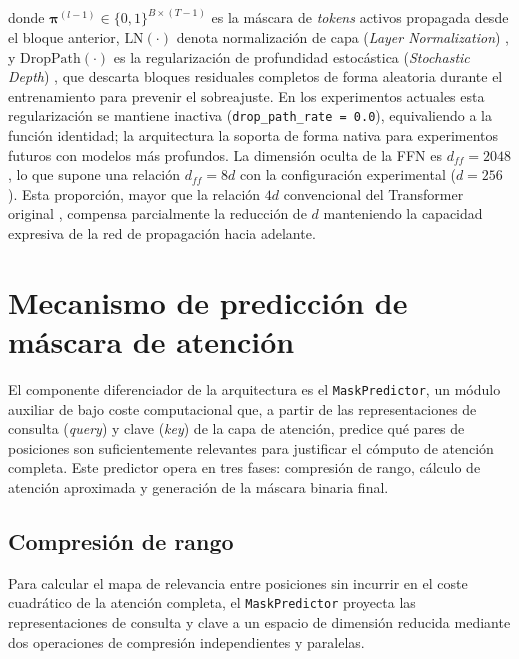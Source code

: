 donde $\boldsymbol{\pi}^{(l-1)} \in \{0,1\}^{B \times (T-1)}$ es la máscara de
\textit{tokens} activos propagada desde el bloque anterior, $\text{LN}(\cdot)$ denota
normalización de capa (\textit{Layer Normalization}) \cite{ba2016layer}, y $\text{DropPath}(\cdot)$ es la regularización de profundidad
estocástica (\textit{Stochastic Depth}) \cite{huang2016deep},
que descarta bloques residuales completos de forma aleatoria
durante el entrenamiento para prevenir el sobreajuste. En los
experimentos actuales esta regularización se mantiene inactiva
(\texttt{drop\_path\_rate = 0.0}), equivaliendo a la función
identidad; la arquitectura la soporta de forma nativa para
experimentos futuros con modelos más profundos.
La dimensión oculta de la FFN es $d_{ff} = 2048$, lo que supone
una relación $d_{ff} = 8d$ con la configuración experimental
($d = 256$). Esta proporción, mayor que la relación $4d$
convencional del Transformer original \cite{vaswani2017attention},
compensa parcialmente la reducción de $d$ manteniendo la capacidad
expresiva de la red de propagación hacia adelante.

\section{Mecanismo de predicción de máscara de atención}
\label{sec:mask_predictor}

El componente diferenciador de la arquitectura es el \texttt{MaskPredictor}, un módulo
auxiliar de bajo coste computacional que, a partir de las representaciones de consulta
(\textit{query}) y clave (\textit{key}) de la capa de atención, predice qué pares de
posiciones son suficientemente relevantes para justificar el cómputo de atención completa.
Este predictor opera en tres fases: compresión de rango, cálculo de atención aproximada
y generación de la máscara binaria final.

\subsection{Compresión de rango}
\label{subsec:compresion_rango}

Para calcular el mapa de relevancia entre posiciones sin incurrir en el coste cuadrático
de la atención completa, el \texttt{MaskPredictor} proyecta las representaciones de
consulta y clave a un espacio de dimensión reducida mediante dos operaciones de
compresión independientes y paralelas.

